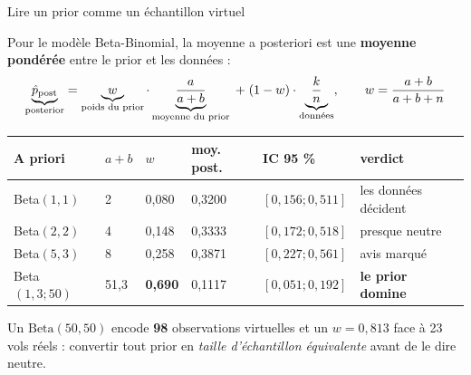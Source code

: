 \begin{frame}{Lire un prior comme un échantillon virtuel}
\begin{ebox}
Pour le modèle Beta-Binomial, la moyenne a posteriori est une \textbf{moyenne pondérée}
entre le prior et les données :
\[
\underbrace{\hat p_{\text{post}}}_{\text{posterior}}=
\underbrace{w}_{\text{poids du prior}} \cdot \underbrace{\frac{a}{a+b}}_{\text{moyenne du prior}}
\;+\;(1-w)\cdot \underbrace{\frac{k}{n}}_{\text{données}},
\qquad w = \frac{a+b}{a+b+n}
\]
\end{ebox}
\vspace{1mm}
\centering
\begin{tabular}{@{}p{1.8cm}p{0.9cm}p{1.3cm}p{1.8cm}p{2.3cm}p{3.9cm}@{}}
\toprule
\textbf{A priori} & $a+b$ & $w$ & \textbf{moy. post.} & \textbf{IC 95 \%} & \textbf{verdict} \\
\midrule
Beta$(1,1)$ & 2 & 0,080 & 0,3200 & $[0{,}156;0{,}511]$ & les données décident \\
Beta$(2,2)$ & 4 & 0,148 & 0,3333 & $[0{,}172;0{,}518]$ & presque neutre \\
Beta$(5,3)$ & 8 & 0,258 & 0,3871 & $[0{,}227;0{,}561]$ & avis marqué \\
Beta$(1{,}3;50)$ & 51,3 & \textbf{0,690} & 0,1117 & $[0{,}051;0{,}192]$ & \textbf{le prior domine} \\
\bottomrule
\end{tabular}
\vspace{1.5mm}
\begin{wbox}
Un $\mathrm{Beta}(50,50)$ encode \textbf{98} observations virtuelles et un
$w = 0{,}813$ face à 23 vols réels : convertir tout prior en \emph{taille
d'échantillon équivalente} avant de le dire neutre.
\end{wbox}
\end{frame}

